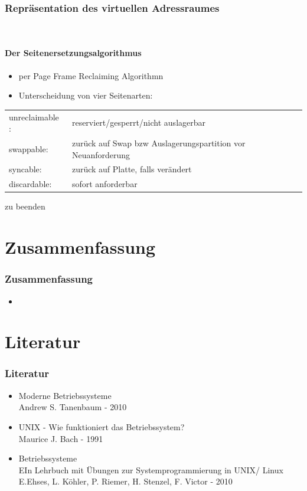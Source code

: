 \documentclass[ddcfooter]{tudbeamer}
\begin{document}
\begin{frame}
	\frametitle{Repräsentation des virtuellen Adressraumes}\
	\framesubtitle {Der Seitenersetzungsalgorithmus}
 	\begin{itemize}
		\item per Page Frame Reclaiming Algorithmn
		\item Unterscheidung von vier Seitenarten:
	\end{itemize}	
		
		\begin{center}
		{\tiny
		\begin{tabular}{ l l }
 			 unreclaimable :&  reserviert/gesperrt/nicht auslagerbar \\
  			 swappable:       &  zurück auf Swap bzw Auslagerungspartition vor Neuanforderung\\
 			 syncable:		 &  zurück auf Platte, falls verändert\\
			 discardable:      & sofort anforderbar\\
		\end{tabular}
		}
		\end{center}
		
		zu beenden

			
    
\end{frame}



\section{Zusammenfassung}
\begin{frame}
    \frametitle{Zusammenfassung}
    \begin{itemize}
         \item   
    
    
    
     \end{itemize}
    
\end{frame}


\section{Literatur}
\begin{frame}
    \frametitle{Literatur}
    \begin{itemize}
         \item  Moderne Betriebssysteme \\
        		Andrew S. Tanenbaum - 2010
	\item	 UNIX - Wie funktioniert das Betriebssystem? \\
		Maurice J. Bach - 1991
	\item Betriebssysteme\\
		EIn Lehrbuch mit Übungen zur Systemprogrammierung in UNIX/ Linux \\
		E.Ehses, L. Köhler, P. Riemer, H. Stenzel, F. Victor - 2010	
    \end{itemize}
    
\end{frame}
\end{document}
